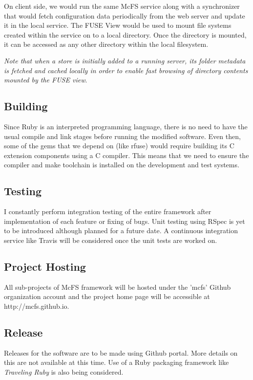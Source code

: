 On client side, we would run the same McFS service along with a synchronizer that would fetch configuration data periodically from the web server and update it in the local service. The FUSE View would be used to mount file systems created within the service on to a local directory. Once the directory is mounted, it can be accessed as any other directory within the local filesystem.

\emph{Note that when a store is initially added to a running server, its folder metadata is fetched and cached locally in order to enable fast browsing of directory contents mounted by the FUSE view}.

\subsection{Building}
Since Ruby is an interpreted programming language, there is no need to have the usual compile and link stages before running the modified software. Even then, some of the gems that we depend on (like rfuse) would require building its C extension components using a C compiler. This means that we need to ensure the compiler and make toolchain is installed on the development and test systems.

\subsection{Testing}
I constantly perform integration testing of the entire framework after implementation of each feature or fixing of bugs. Unit testing using RSpec is yet to be introduced although planned for a future date. A continuous integration service like Travis\cite{site:travisci} will be considered once the unit tests are worked on.

\subsection{Project Hosting}
All sub-projects of McFS framework will be hosted under the 'mcfs' Github organization account and the project home page will be accessible at http://mcfs.github.io.

\subsection{Release}
Releases for the software are to be made using Github portal. More details on this are not available at this time. Use of a Ruby packaging framework like \emph{Traveling Ruby}\cite{site:travelingruby} is also being considered.

